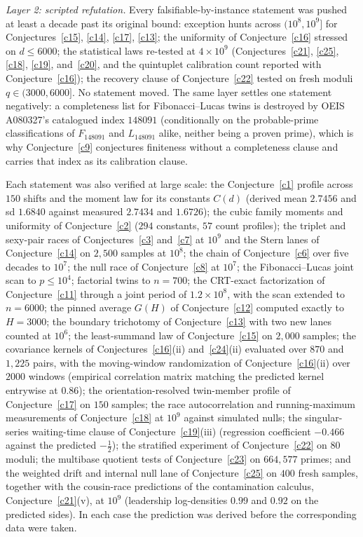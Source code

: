 \documentclass[11pt]{article}
\theoremstyle{definition}
\begin{document}
\emph{Layer 2: scripted refutation.}  Every
falsifiable-by-instance statement was pushed at least a decade past its
original bound: exception hunts across $(10^8,10^9]$ for
Conjectures~\ref{c15}, \ref{c14}, \ref{c17}, \ref{c13}; the uniformity
of Conjecture~\ref{c16} stressed on $d\le6000$; the statistical laws
re-tested at $4\times10^9$ (Conjectures~\ref{c21}, \ref{c25},
\ref{c18}, \ref{c19}, and~\ref{c20}, and the quintuplet calibration
count reported with Conjecture~\ref{c16}); the recovery clause of
Conjecture~\ref{c22} tested on fresh moduli $q\in(3000,6000]$.  No
statement moved.  The same layer settles one statement negatively: a
completeness list for Fibonacci--Lucas twins is destroyed by OEIS
A080327's catalogued index $148091$ (conditionally on the
probable-prime classifications of $F_{148091}$ and $L_{148091}$
alike, neither being a proven prime), which is why
Conjecture~\ref{c9} conjectures finiteness without a completeness
clause and carries that index as its calibration clause.

Each statement was also verified at large scale: the
Conjecture~\ref{c1} profile across $150$ shifts and the moment law for
its constants $C(d)$ (derived mean $2.7456$ and sd $1.6840$ against
measured $2.7434$ and $1.6726$); the cubic family moments and
uniformity of Conjecture~\ref{c2} ($294$ constants, $57$ count
profiles); the triplet and sexy-pair races of Conjectures~\ref{c3}
and~\ref{c7} at $10^9$ and the Stern lanes of Conjecture~\ref{c14} on
$2{,}500$ samples at $10^8$; the chain of Conjecture~\ref{c6} over five
decades to $10^7$; the null race of Conjecture~\ref{c8} at $10^7$; the
Fibonacci--Lucas joint scan to $p\le10^4$; factorial twins to $n=700$;
the CRT-exact factorization of Conjecture~\ref{c11} through a joint
period of $1.2\times10^8$, with the scan extended to $n=6000$; the
pinned average $G(H)$ of Conjecture~\ref{c12} computed exactly to
$H=3000$; the boundary trichotomy of Conjecture~\ref{c13} with two new
lanes counted at $10^6$; the least-summand law of
Conjecture~\ref{c15} on $2{,}000$ samples; the covariance kernels of
Conjectures~\ref{c16}(ii) and~\ref{c24}(ii) evaluated over $870$ and
$1{,}225$ pairs, with the moving-window randomization of
Conjecture~\ref{c16}(ii) over $2000$ windows (empirical correlation
matrix matching the predicted kernel entrywise at $0.86$); the
orientation-resolved twin-member profile of Conjecture~\ref{c17} on
$150$ samples; the race autocorrelation and running-maximum
measurements of Conjecture~\ref{c18} at $10^9$ against simulated
nulls; the singular-series waiting-time clause of
Conjecture~\ref{c19}(iii) (regression coefficient $-0.466$ against the
predicted $-\tfrac12$); the stratified experiment of
Conjecture~\ref{c22} on $80$ moduli; the multibase quotient tests of
Conjecture~\ref{c23} on $664{,}577$ primes; and the weighted drift and
internal null lane of Conjecture~\ref{c25} on $400$ fresh samples,
together with the cousin-race predictions of the contamination
calculus, Conjecture~\ref{c21}(v), at $10^9$ (leadership log-densities
$0.99$ and $0.92$ on the predicted sides).  In each case the
prediction was derived before the corresponding data were taken.
\end{document}
